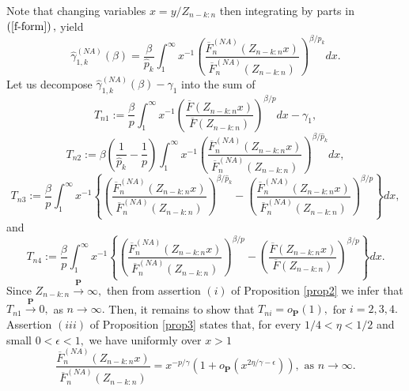 \documentclass[reqno,openbib,runningheads,a4paper,12pt]{amsart}%
\begin{document}
Note that changing variables $x=y/Z_{n-k:n}$ then integrating by parts in
$\left(  \ref{f-form}\right)  ,$ yield
\[
\widehat{\gamma}_{1,k}^{\left(  NA\right)  }\left(  \beta\right)  =\frac
{\beta}{\widehat{p}_{k}}\int_{1}^{\infty}x^{-1}\left(  \frac{\overline{F}%
_{n}^{\left(  NA\right)  }\left(  Z_{n-k:n}x\right)  }{\overline{F}%
_{n}^{\left(  NA\right)  }\left(  Z_{n-k:n}\right)  }\right)  ^{\beta
/\widehat{p}_{k}}dx.
\]
Let us decompose $\widehat{\gamma}_{1,k}^{\left(  NA\right)  }\left(
\beta\right)  -\gamma_{1}$ into the sum of%
\[
T_{n1}:=\frac{\beta}{p}\int_{1}^{\infty}x^{-1}\left(  \frac{\overline
{F}\left(  Z_{n-k:n}x\right)  }{\overline{F}\left(  Z_{n-k:n}\right)
}\right)  ^{\beta/p}dx-\gamma_{1},
\]%
\[
T_{n2}:=\beta\left(  \frac{1}{\widehat{p}_{k}}-\frac{1}{p}\right)  \int%
_{1}^{\infty}x^{-1}\left(  \frac{\overline{F}_{n}^{\left(  NA\right)  }\left(
Z_{n-k:n}x\right)  }{\overline{F}_{n}^{\left(  NA\right)  }\left(
Z_{n-k:n}\right)  }\right)  ^{\beta/\widehat{p}_{k}}dx,
\]%
\[
T_{n3}:=\frac{\beta}{p}\int_{1}^{\infty}x^{-1}\left\{  \left(  \frac
{\overline{F}_{n}^{\left(  NA\right)  }\left(  Z_{n-k:n}x\right)  }%
{\overline{F}_{n}^{\left(  NA\right)  }\left(  Z_{n-k:n}\right)  }\right)
^{\beta/\widehat{p}_{k}}-\left(  \frac{\overline{F}_{n}^{\left(  NA\right)
}\left(  Z_{n-k:n}x\right)  }{\overline{F}_{n}^{\left(  NA\right)  }\left(
Z_{n-k:n}\right)  }\right)  ^{\beta/p}\right\}  dx,
\]
and%
\[
T_{n4}:=\frac{\beta}{p}\int_{1}^{\infty}x^{-1}\left\{  \left(  \frac
{\overline{F}_{n}^{\left(  NA\right)  }\left(  Z_{n-k:n}x\right)  }%
{\overline{F}_{n}^{\left(  NA\right)  }\left(  Z_{n-k:n}\right)  }\right)
^{\beta/p}-\left(  \frac{\overline{F}\left(  Z_{n-k:n}x\right)  }{\overline
{F}\left(  Z_{n-k:n}\right)  }\right)  ^{\beta/p}\right\}  dx.
\]
Since $Z_{n-k:n}\overset{\mathbf{P}}{\rightarrow}\infty,$ then from assertion
$\left(  i\right)  $ of Proposition \ref{prop2} we infer that $T_{n1}%
\overset{\mathbf{P}}{\rightarrow}0,$ as $n\rightarrow\infty.$ Then, it remains
to show that $T_{ni}=o_{\mathbf{P}}\left(  1\right)  ,$ for $i=2,3,4.$
Assertion $\left(  iii\right)  $ of Proposition \ref{prop3} states that, for
every $1/4<\eta<1/2$ and small $0<\epsilon<1,$ we have uniformly over $x>1$%
\begin{equation}
\frac{\overline{F}_{n}^{\left(  NA\right)  }\left(  Z_{n-k:n}x\right)
}{\overline{F}_{n}^{\left(  NA\right)  }\left(  Z_{n-k:n}\right)
}=x^{-p/\gamma}\left(  1+o_{\mathbf{P}}\left(  x^{2\eta/\gamma-\epsilon
}\right)  \right)  ,\text{ as }n\rightarrow\infty. \label{app-Fn}%
\end{equation}
\end{document}
